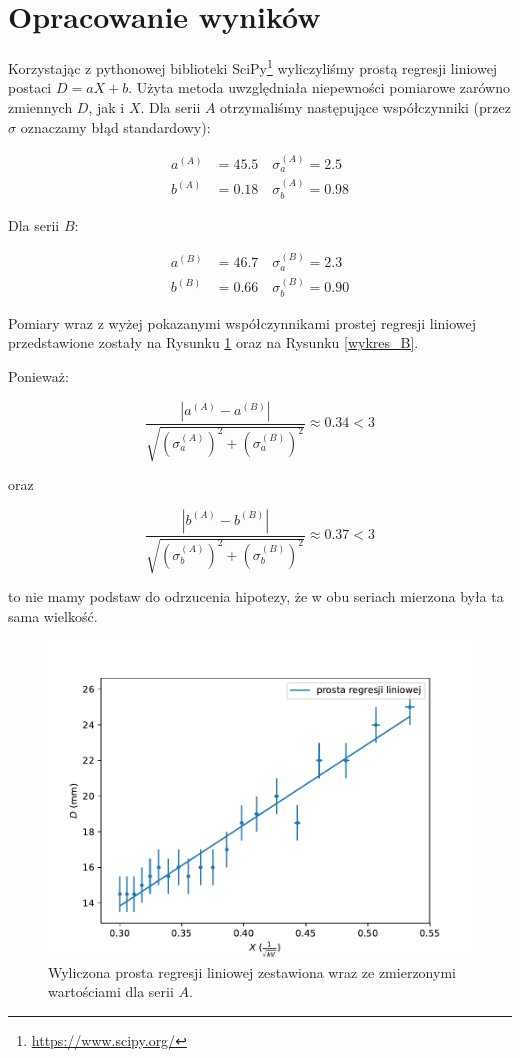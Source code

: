 \documentclass[a4paper]{article}
\begin{document}
\section{Opracowanie wyników}

Korzystając z pythonowej biblioteki SciPy\footnote{\url{https://www.scipy.org/}} wyliczyliśmy prostą regresji liniowej postaci $D = aX + b$.
Użyta metoda uwzględniała niepewności pomiarowe zarówno zmiennych $D$, jak i $X$.
Dla serii $A$ otrzymaliśmy następujące współczynniki (przez $\sigma$ oznaczamy błąd standardowy):

\begin{align*}
	a^{(A)} &= 45.5 \quad \sigma_a^{(A)} = 2.5 \\
	b^{(A)} &= 0.18 \quad \sigma_b^{(A)} = 0.98
\end{align*}

Dla serii $B$:

\begin{align*}
	a^{(B)} &= 46.7 \quad \sigma_a^{(B)} = 2.3 \\
	b^{(B)} &= 0.66 \quad \sigma_b^{(B)} = 0.90
\end{align*}

Pomiary wraz z wyżej pokazanymi współczynnikami prostej regresji liniowej przedstawione zostały na Rysunku \ref{wykres_A} oraz na Rysunku \ref{wykres_B}.

Ponieważ:

$$\frac{\left| a^{(A)} - a^{(B)} \right|}{\sqrt{\left(\sigma_a^{(A)}\right)^2 + \left(\sigma_a^{(B)}\right)^2}} \approx 0.34 < 3$$

oraz 

$$\frac{\left| b^{(A)} - b^{(B)} \right|}{\sqrt{\left(\sigma_b^{(A)}\right)^2 + \left(\sigma_b^{(B)}\right)^2}} \approx 0.37 < 3$$

to nie mamy podstaw do odrzucenia hipotezy, że w obu seriach mierzona była ta sama wielkość.

\begin{figure}[h]
\centering
\includegraphics[scale=0.7]{wykres_A.pdf}
\caption{Wyliczona prosta regresji liniowej zestawiona wraz ze zmierzonymi wartościami dla serii $A$.}
\label{wykres_A}
\end{figure}
\end{document}
